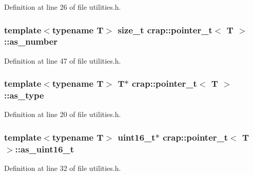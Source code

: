 Definition at line 26 of file utilities.\+h.

\hypertarget{structcrap_1_1pointer__t_ae1469dc75976e619e2b330e7be44a2fa}{}
\subsubsection[{as\+\_\+number}]{\setlength{\rightskip}{0pt plus 5cm}template$<$typename T$>$ size\+\_\+t {\bf crap\+::pointer\+\_\+t}$<$ T $>$\+::as\+\_\+number}\label{structcrap_1_1pointer__t_ae1469dc75976e619e2b330e7be44a2fa}


Definition at line 47 of file utilities.\+h.

\hypertarget{structcrap_1_1pointer__t_a345d4e69dd07c3dcaacbb462f3d67745}{}
\subsubsection[{as\+\_\+type}]{\setlength{\rightskip}{0pt plus 5cm}template$<$typename T$>$ T$\ast$ {\bf crap\+::pointer\+\_\+t}$<$ T $>$\+::as\+\_\+type}\label{structcrap_1_1pointer__t_a345d4e69dd07c3dcaacbb462f3d67745}


Definition at line 20 of file utilities.\+h.

\hypertarget{structcrap_1_1pointer__t_a9c9b5ae3d6475830d13c0ab770b9d056}{}
\subsubsection[{as\+\_\+uint16\+\_\+t}]{\setlength{\rightskip}{0pt plus 5cm}template$<$typename T$>$ uint16\+\_\+t$\ast$ {\bf crap\+::pointer\+\_\+t}$<$ T $>$\+::as\+\_\+uint16\+\_\+t}\label{structcrap_1_1pointer__t_a9c9b5ae3d6475830d13c0ab770b9d056}


Definition at line 32 of file utilities.\+h.

\hypertarget{structcrap_1_1pointer__t_adf2f1a4f92a44f4899bab5d1743e0b0b}{}
